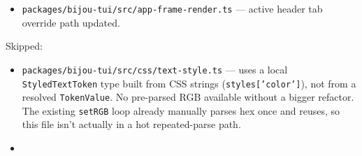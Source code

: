 \begin{itemize}
\item
  \texttt{p\allowbreak{}a\allowbreak{}c\allowbreak{}k\allowbreak{}a\allowbreak{}g\allowbreak{}e\allowbreak{}s\allowbreak{}/\allowbreak{}b\allowbreak{}i\allowbreak{}j\allowbreak{}o\allowbreak{}u\allowbreak{}-\allowbreak{}t\allowbreak{}u\allowbreak{}i\allowbreak{}/\allowbreak{}s\allowbreak{}r\allowbreak{}c\allowbreak{}/\allowbreak{}a\allowbreak{}p\allowbreak{}p\allowbreak{}-\allowbreak{}f\allowbreak{}r\allowbreak{}a\allowbreak{}m\allowbreak{}e\allowbreak{}-\allowbreak{}r\allowbreak{}e\allowbreak{}n\allowbreak{}d\allowbreak{}e\allowbreak{}r\allowbreak{}.\allowbreak{}t\allowbreak{}s} --- active header tab override path updated.
\end{itemize}

Skipped:

\begin{itemize}
\tightlist
\item
  \texttt{p\allowbreak{}a\allowbreak{}c\allowbreak{}k\allowbreak{}a\allowbreak{}g\allowbreak{}e\allowbreak{}s\allowbreak{}/\allowbreak{}b\allowbreak{}i\allowbreak{}j\allowbreak{}o\allowbreak{}u\allowbreak{}-\allowbreak{}t\allowbreak{}u\allowbreak{}i\allowbreak{}/\allowbreak{}s\allowbreak{}r\allowbreak{}c\allowbreak{}/\allowbreak{}c\allowbreak{}s\allowbreak{}s\allowbreak{}/\allowbreak{}t\allowbreak{}e\allowbreak{}x\allowbreak{}t\allowbreak{}-\allowbreak{}s\allowbreak{}t\allowbreak{}y\allowbreak{}l\allowbreak{}e\allowbreak{}.\allowbreak{}t\allowbreak{}s} --- uses a local \texttt{S\allowbreak{}t\allowbreak{}y\allowbreak{}l\allowbreak{}e\allowbreak{}d\allowbreak{}T\allowbreak{}e\allowbreak{}x\allowbreak{}t\allowbreak{}T\allowbreak{}o\allowbreak{}k\allowbreak{}e\allowbreak{}n} type built from CSS strings (\texttt{s\allowbreak{}t\allowbreak{}y\allowbreak{}l\allowbreak{}e\allowbreak{}s\allowbreak{}[\allowbreak{}'\allowbreak{}c\allowbreak{}o\allowbreak{}l\allowbreak{}o\allowbreak{}r\allowbreak{}'\allowbreak{}]}), not from a resolved \texttt{T\allowbreak{}o\allowbreak{}k\allowbreak{}e\allowbreak{}n\allowbreak{}V\allowbreak{}a\allowbreak{}l\allowbreak{}u\allowbreak{}e}. No pre-parsed RGB available without a bigger refactor. The existing \texttt{s\allowbreak{}e\allowbreak{}t\allowbreak{}R\allowbreak{}G\allowbreak{}B} loop already manually parses hex once and reuses, so this file isn't actually in a hot repeated-parse path.
\item

\end{itemize}

